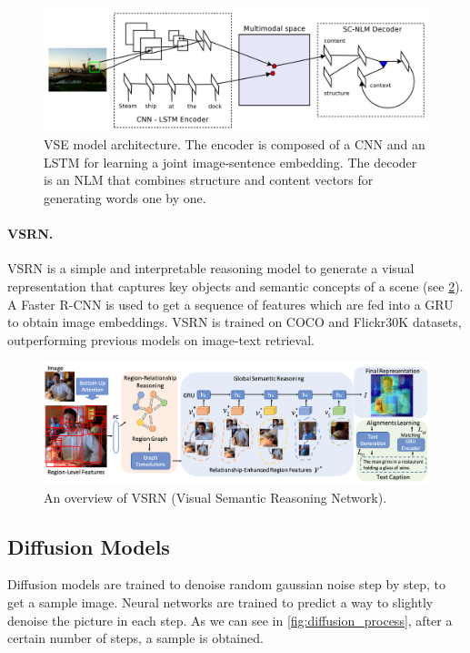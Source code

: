 \begin{figure}[ht]
    \centering
    \includegraphics[width=\linewidth]{images/models/vse.png}
    \caption{VSE model architecture. The encoder is composed of a CNN and an LSTM for learning a joint image-sentence embedding. The decoder is an NLM that combines structure and content vectors for generating words one by one.}
    \label{fig:vse}
\end{figure}

\paragraph{VSRN.} VSRN \cite{li2019vsrn} is a simple and interpretable reasoning model to generate a visual representation that captures key objects and semantic concepts of a scene (see \cref{fig:vsrn}). A Faster R-CNN is used to get a sequence of features which are fed into a GRU to obtain image embeddings. VSRN is trained on COCO and Flickr30K datasets, outperforming previous models on image-text retrieval.

\begin{figure}[ht]
    \centering
    \includegraphics[width=\linewidth]{images/models/vsrn.png}
    \caption{An overview of VSRN (Visual Semantic Reasoning Network).}
    \label{fig:vsrn}
\end{figure}

\subsection{Diffusion Models} \label{sec:diffusion_models}

Diffusion models are trained to denoise random gaussian noise step by step, to get a sample image. Neural networks are trained to predict a way to slightly denoise the picture in each step. As we can see in \cref{fig:diffusion_process}, after a certain number of steps, a sample is obtained.


